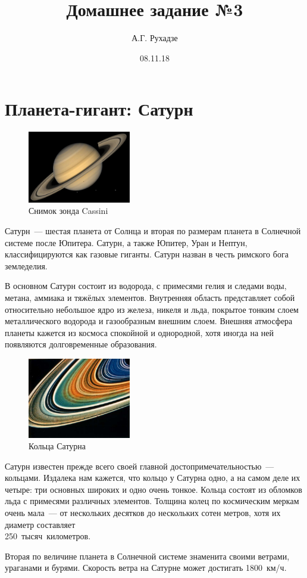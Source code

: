 \documentclass{article}
\title{Домашнее задание №3}
\author{А.Г. Рухадзе}
\date{08.11.18}
\begin{document}
	\maketitle
	
    \section{Планета-гигант: Сатурн} 
\setlength\parindent{0.75 cm}
\begin{figure}
\centering
\includegraphics[width = 0.4\textwidth]{img/Saturn}
\caption{Снимок зонда Cassini}
\end{figure}
Сатурн~--- шестая планета от Солнца и вторая по размерам планета в Солнечной системе после Юпитера. Сатурн, а также Юпитер, Уран и Нептун, классифицируются как газовые гиганты. Сатурн назван в честь римского бога земледелия. \par
В основном Сатурн состоит из водорода, с примесями гелия и следами воды, метана, аммиака и тяжёлых элементов. Внутренняя область представляет собой относительно небольшое ядро из железа, никеля и льда, покрытое тонким слоем металлического водорода и газообразным внешним слоем. Внешняя атмосфера планеты кажется из космоса спокойной и однородной, хотя иногда на ней появляются долговременные образования. \par
\begin{figure}
\centering
\includegraphics[width = 0.4\textwidth]{img/SaturnRings}
\caption{Кольца Сатурна}
\end{figure}
    Сатурн известен прежде всего своей главной достопримечательностью~--- кольцами. Издалека нам кажется, что кольцо у Сатурна одно, а на самом деле их четыре: три основных широких и одно очень тонкое. Кольца состоят из обломков льда с примесями различных элементов. Толщина колец по космическим меркам очень мала~--- от нескольких десятков до нескольких сотен метров, хотя их диаметр составляет \\250~тысяч~километров. \par
    Вторая по величине планета в Солнечной системе знаменита своими ветрами, ураганами и бурями. Скорость ветра на Сатурне может достигать 1800~км/ч.
    
\end{document}
